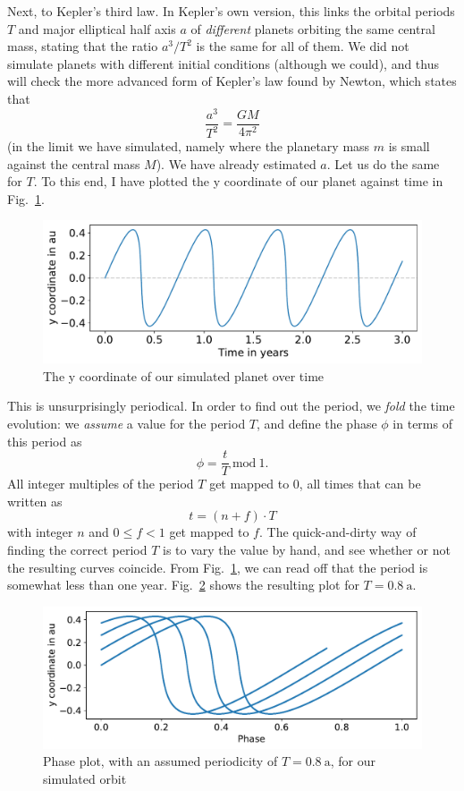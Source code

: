 \documentclass[twocolumn,apj]{openjournal}
\newcommand{\be}{\begin{equation}}
\newcommand{\ee}{\end{equation}}
\begin{document}
Next, to Kepler's third law. In Kepler's own version, this links the orbital periods $T$ and major elliptical half axis $a$ of {\em different} planets orbiting the same central mass, stating that the ratio $a^3/T^2$ is the same for all of them. We did not simulate planets with different initial conditions (although we could), and thus will check the more advanced form of Kepler's law found by Newton, which states that
\be
\frac{a^3}{T^2} = \frac{GM}{4\pi^2}
\label{ThirdKeplerNewton}
\ee
(in the limit we have simulated, namely where the planetary mass $m$ is small against the central mass $M$). We have already estimated $a$. Let us do the same for $T$. To this end, I have plotted the y coordinate of our planet against time in Fig.~\ref{OrbitY}.
\begin{figure}[htbp]
\begin{center}
\includegraphics[width=\linewidth]{orbitPeriodicity.pdf}
\caption{The y coordinate of our simulated planet over time}
\label{OrbitY}
\end{center}
\end{figure}
This is unsurprisingly periodical. In order to find out the period, we {\em fold} the time evolution: we {\em assume} a value for the period $T$, and define the phase $\phi$ in terms of this period as
\be
\phi = \frac{t}{T}\: \mbox{mod}\: 1.
\ee
All integer multiples of the period $T$ get mapped to 0, all times that can be written as
\be
t = (n+f)\cdot T
\ee
with integer $n$ and $0\le f<1$ get mapped to $f$. The quick-and-dirty way of finding the correct period $T$ is to vary the value by hand, and see whether or not the resulting curves coincide. From Fig.~\ref{OrbitY}, we can read off that the period is somewhat less than one year. Fig.~\ref{Shifted08} shows the resulting plot for $T=0.8\:\mbox{a}$. 
\begin{figure}[htbp]
\begin{center}
\includegraphics[width=\linewidth]{phase08Periodicity.pdf}
\caption{Phase plot, with an assumed periodicity of $T=0.8\:\mbox{a}$, for our simulated orbit}
\label{Shifted08}
\end{center}
\end{figure}
\end{document}
